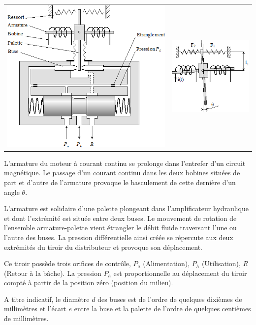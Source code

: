 \documentclass[10pt,oneside]{article}
\begin{document}
\begin{center}
\begin{tabular}{cc}
\includegraphics[width=.45\textwidth]{png/image6.png}&
\includegraphics[width=.45\textwidth]{png/image7.png}
\end{tabular}
\end{center}

L’armature du moteur à courant continu se prolonge dans l’entrefer d’un circuit magnétique. Le passage
d’un courant continu dans les deux bobines situées de part et d’autre de l’armature provoque le
basculement de cette dernière d’un angle $\theta$.

L’armature est solidaire d’une palette plongeant dans l’amplificateur hydraulique et dont l’extrémité est
située entre deux buses. Le mouvement de rotation de l’ensemble armature-palette vient étrangler le débit
fluide traversant l’une ou l’autre des buses. La pression différentielle ainsi créée se répercute aux deux
extrémités du tiroir du distributeur et provoque son déplacement.

Ce tiroir possède trois orifices de contrôle, $P_a$ (Alimentation), $P_h$ (Utilisation), $R$ (Retour à la bâche). La pression $P_h$ est proportionnelle au déplacement du tiroir compté à partir de la position zéro (position du
milieu).

A titre indicatif, le diamètre $d$ des buses est de l’ordre de quelques dixièmes de millimètres et l’écart $e$
entre la buse et la palette de l’ordre de quelques centièmes de millimètres.
\end{document}
